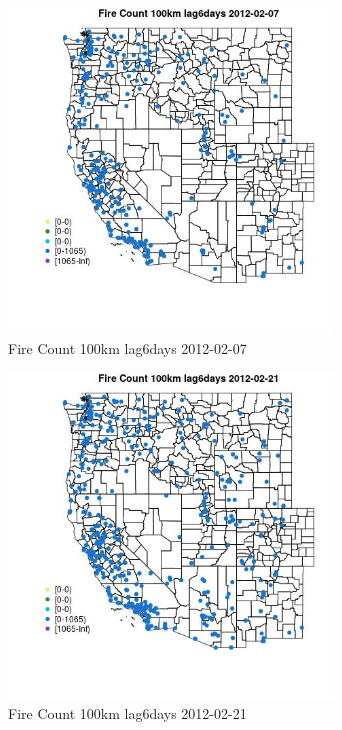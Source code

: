 \begin{figure} 
\centering  
\includegraphics[width=0.77\textwidth]{Code_Outputs/Report_ML_input_PM25_Step4_part_f_de_duplicated_aves_prioritize_24hr_obswNAs_MapObsFire_Count_100km_lag6days2012-02-07.jpg} 
\caption{\label{fig:Report_ML_input_PM25_Step4_part_f_de_duplicated_aves_prioritize_24hr_obswNAsMapObsFire_Count_100km_lag6days2012-02-07}Fire Count 100km lag6days 2012-02-07} 
\end{figure} 
 

\begin{figure} 
\centering  
\includegraphics[width=0.77\textwidth]{Code_Outputs/Report_ML_input_PM25_Step4_part_f_de_duplicated_aves_prioritize_24hr_obswNAs_MapObsFire_Count_100km_lag6days2012-02-21.jpg} 
\caption{\label{fig:Report_ML_input_PM25_Step4_part_f_de_duplicated_aves_prioritize_24hr_obswNAsMapObsFire_Count_100km_lag6days2012-02-21}Fire Count 100km lag6days 2012-02-21} 
\end{figure} 
 

